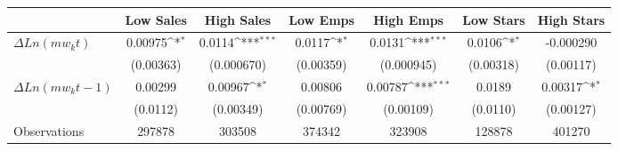{
\def\sym#1{\ifmmode^{#1}\else\(^{#1}\)\fi}
\begin{tabular}{l*{6}{c}}
\hline\hline
                    &\multicolumn{1}{c}{Low Sales}&\multicolumn{1}{c}{High Sales}&\multicolumn{1}{c}{Low Emps}&\multicolumn{1}{c}{High Emps}&\multicolumn{1}{c}{Low Stars}&\multicolumn{1}{c}{High Stars}\\
\hline
$\Delta Ln(mw_kt)$  &     0.00975\sym{*}  &      0.0114\sym{***}&      0.0117\sym{*}  &      0.0131\sym{***}&      0.0106\sym{*}  &   -0.000290         \\
                    &   (0.00363)         &  (0.000670)         &   (0.00359)         &  (0.000945)         &   (0.00318)         &   (0.00117)         \\
[1em]
$\Delta Ln(mw_kt-1)$&     0.00299         &     0.00967\sym{*}  &     0.00806         &     0.00787\sym{***}&      0.0189         &     0.00317\sym{*}  \\
                    &    (0.0112)         &   (0.00349)         &   (0.00769)         &   (0.00109)         &    (0.0110)         &   (0.00127)         \\
\hline
Observations        &      297878         &      303508         &      374342         &      323908         &      128878         &      401270         \\
\hline\hline
\end{tabular}
}
